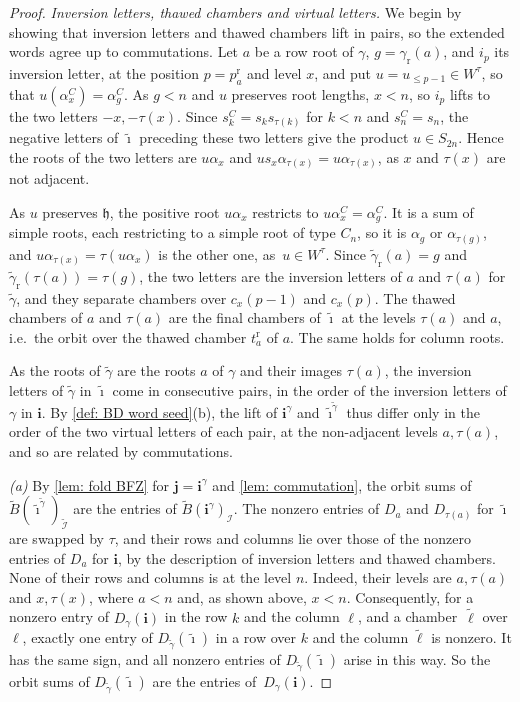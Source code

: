 \documentclass[a4paper]{amsart}
\numberwithin{equation}{section}
\theoremstyle{definition}
\theoremstyle{remark}
\newcommand{\mfh}{\mathfrak{h}}
\newcommand{\mcI}{\mathcal{I}}
\newcommand{\bfi}{\mathbf{i}}
\newcommand{\tbfi}{\widetilde{\boldsymbol{\imath}}}
\newcommand{\bfj}{\mathbf{j}}
\newcommand{\tB}{\widetilde{B}}
\newcommand{\tg}{\widetilde{\gamma}}
\newcommand{\rr}{\mathrm{r}}
\begin{document}
\begin{proof}
  \emph{Inversion letters, thawed chambers and virtual letters.} We begin by showing that inversion letters and thawed chambers lift in pairs, so the extended words agree up to commutations.
  Let $a$ be a row root of $\gamma$, $g=\gamma_{\rr}(a)$, and $i_p$ its inversion letter, at the position $p=p^\rr_a$ and level $x$, and put $u=u_{\le p-1}\in W^\tau$, so that $u(\alpha^C_x)=\alpha^C_g$.
  As $g<n$ and $u$ preserves root lengths, $x<n$, so $i_p$ lifts to the two letters $-x,-\tau(x)$.
  Since $s^C_k=s_ks_{\tau(k)}$ for $k<n$ and $s^C_n=s_n$, the negative letters of $\tbfi$ preceding these two letters give the product $u\in S_{2n}$.
  Hence the roots of the two letters are $u\alpha_x$ and $us_x\alpha_{\tau(x)}=u\alpha_{\tau(x)}$, as $x$ and $\tau(x)$ are not adjacent.

  As $u$ preserves $\mfh$, the positive root $u\alpha_x$ restricts to $u\alpha^C_x=\alpha^C_g$.
  It is a sum of simple roots, each restricting to a simple root of type $C_n$, so it is $\alpha_g$ or $\alpha_{\tau(g)}$, and $u\alpha_{\tau(x)}=\tau(u\alpha_x)$ is the other one, as~$u\in W^\tau$.
  Since $\tg_{\rr}(a)=g$ and $\tg_{\rr}(\tau(a))=\tau(g)$, the two letters are the inversion letters of $a$ and $\tau(a)$ for $\tg$, and they separate chambers over $c_x(p-1)$ and $c_x(p)$.
  The thawed chambers of $a$ and $\tau(a)$ are the final chambers of $\tbfi$ at the levels $\tau(a)$ and $a$, i.e.\ the orbit over the thawed chamber $t^\rr_a$ of $a$.
  The same holds for column roots.

  As the roots of $\tg$ are the roots $a$ of $\gamma$ and their images $\tau(a)$, the inversion letters of $\tg$ in $\tbfi$ come in consecutive pairs, in the order of the inversion letters of $\gamma$ in $\bfi$.
  By \cref{def: BD word seed}(b), the lift of $\bfi^\gamma$ and $\tbfi^{\tg}$ thus differ only in the order of the two virtual letters of each pair, at the non-adjacent levels $a,\tau(a)$, and so are related by commutations.

  \emph{(a)} By \cref{lem: fold BFZ} for $\bfj=\bfi^\gamma$ and \cref{lem: commutation}, the orbit sums of $\tB(\tbfi^{\tg})_{\widetilde{\mcI}}$ are the entries of $\tB(\bfi^\gamma)_\mcI$.
  The nonzero entries of $D_a$ and $D_{\tau(a)}$ for $\tbfi$ are swapped by $\tau$, and their rows and columns lie over those of the nonzero entries of $D_a$ for $\bfi$, by the description of inversion letters and thawed chambers.
  None of their rows and columns is at the level $n$.
  Indeed, their levels are $a,\tau(a)$ and $x,\tau(x)$, where $a<n$ and, as shown above, $x<n$.
  Consequently, for a nonzero entry of $D_\gamma(\bfi)$ in the row $k$ and the column $\ell$, and a chamber~$\widetilde{\ell}$ over $\ell$, exactly one entry of $D_{\tg}(\tbfi)$ in a row over $k$ and the column $\widetilde{\ell}$ is nonzero.
  It has the same sign, and all nonzero entries of $D_{\tg}(\tbfi)$ arise in this way.
  So the orbit sums of $D_{\tg}(\tbfi)$ are the entries of~$D_\gamma(\bfi)$.


\end{proof}
\end{document}
